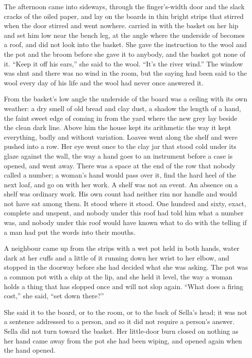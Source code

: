 The afternoon came into  sideways, through the finger's-width door and the slack cracks of the oiled paper, and lay on the boards in thin bright strips that stirred when the door stirred and went nowhere.  carried  in with the basket on her hip and set him low near the bench leg, at the angle where the underside of  becomes a roof, and did not look into the basket. She gave the instruction to the wool and the pot and the broom before she gave it to anybody, and the basket got none of it. “Keep it off his ears,” she said to the wool. “It's the river wind.” The window was shut and there was no wind in the room, but the saying had been said to the wool every day of his life and the wool had never once answered it.

From the basket's low angle the underside of the board was a ceiling with its own weather: a dry smell of old bread and clay dust, a shadow the length of a hand, the faint sweet edge of  coming in from the yard where the new grey lay beside the clean dark line. Above him the house kept its arithmetic the way it kept everything, badly and without variation. Loaves went along the shelf and were pushed into a row. Her eye went once to the clay jar that stood cold under its glaze against the wall, the way a hand goes to an instrument before a case is opened, and went away. There was a space at the end of the row that nobody called a number; a woman's hand would pass over it, find the hard heel of the next loaf, and go on with her work. A shelf was not an event. An absence on a shelf was ordinary work. His own count had neither rim nor handle and would not have sat among them. It stood where it stood. One hundred and sixty, exact, complete and unspent, and nobody under this roof had told him what a number was, and nobody under this roof would have known what to do with the telling if a man had put the words into their mouths.

\scenebreak

A neighbour came up from the strips with a wet pot held in both hands, water dark at her cuffs and a little of it running down her wrist to her elbow, and stopped in the doorway before she had decided what she was asking. The pot was a common pot with a chip at the lip, and she held it level, the way a woman holds a thing that has slopped once and will not slop again. “What does a firing cost,” she said, “set down there?”

She said it to the board, or to the room, or to the back of Sella's head; it was not a sentence addressed to a person, and so it did not require a person's answer. Sella did not turn toward the basket. Her little-door burn closed on nothing as her hand came away from the pot she had been wiping, and opened again when the hand opened.

